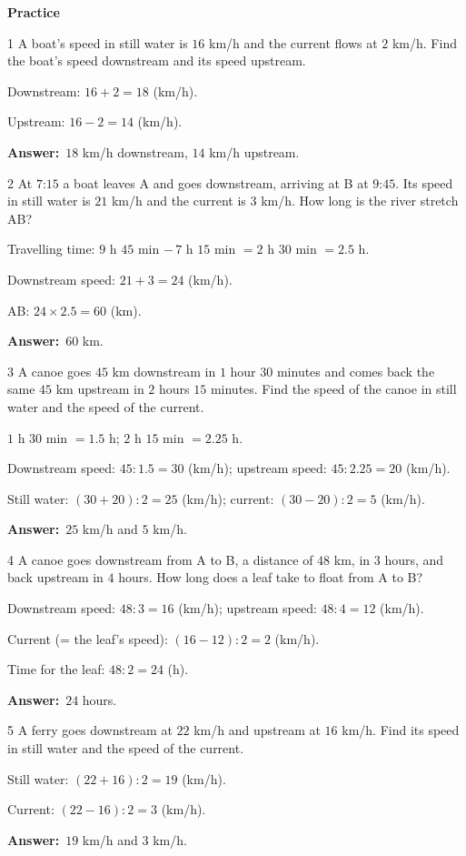 \documentclass[11pt]{article}
\newif\ifsol \solfalse
\providecommand{\AnsWord}{Đáp số}
\newcommand{\dapso}[1]{\par\textbf{\AnsWord:}\ #1}
\newcommand{\probsol}[1]{%
  \begin{lrbox}{\solmeasure}\begin{minipage}{\dimexpr\linewidth-24pt\relax}#1\end{minipage}\end{lrbox}%
  \ifsol
    \begin{solbox}#1\end{solbox}%
  \else
    \setlength{\solht}{\dimexpr\ht\solmeasure+\dp\solmeasure+0.85cm\relax}%
    \ifdim\solht<1.35cm\setlength{\solht}{1.35cm}\fi
    \begin{tcolorbox}[colback=white,colframe=Line,boxrule=0.8pt,arc=5pt,
      left=8pt,right=8pt,top=4pt,bottom=4pt,height=\solht]{\footnotesize\color{Slate}\itshape\WorkWord}\end{tcolorbox}%
  \fi}
\newcommand{\dividerbar}[1]{\par\vspace{0.6em}\noindent
  \begin{tcolorbox}[enhanced,frame hidden,interior hidden,borderline west={5pt}{0pt}{ProbBlue},
    colback=white,left=12pt,right=12pt,top=5pt,bottom=5pt,arc=4pt]
  {\large\bfseries\color{ProbBlue} #1}\end{tcolorbox}\vspace{0.4em}}
\newcommand{\gap}{\vspace{0.3cm}}
\def\WorkWord{Your work:}
\def\AnsWord{Answer}
\begin{document}
\dividerbar{Practice}
\begin{probbox}{1}{\relax}
A boat's speed in still water is $16$ km/h and the current flows at $2$ km/h. Find the boat's speed downstream and its speed upstream.
\end{probbox}
\probsol{
Downstream: $16+2=18$ (km/h).\par Upstream: $16-2=14$ (km/h).
\dapso{$18$ km/h downstream, $14$ km/h upstream.}}
\gap
\begin{probbox}{2}{\relax}
At $7$:$15$ a boat leaves A and goes downstream, arriving at B at $9$:$45$. Its speed in still water is $21$ km/h and the current is $3$ km/h. How long is the river stretch AB?
\end{probbox}
\probsol{
Travelling time: $9$ h $45$ min $-\,7$ h $15$ min $=2$ h $30$ min $=2.5$ h.\par
Downstream speed: $21+3=24$ (km/h).\par AB: $24\times2.5=60$ (km).
\dapso{$60$ km.}}
\gap
\begin{probbox}{3}{\relax}
A canoe goes $45$ km downstream in $1$ hour $30$ minutes and comes back the same $45$ km upstream in $2$ hours $15$ minutes. Find the speed of the canoe in still water and the speed of the current.
\end{probbox}
\probsol{
$1$ h $30$ min $=1.5$ h; $2$ h $15$ min $=2.25$ h.\par
Downstream speed: $45:1.5=30$ (km/h); upstream speed: $45:2.25=20$ (km/h).\par
Still water: $(30+20):2=25$ (km/h); current: $(30-20):2=5$ (km/h).
\dapso{$25$ km/h and $5$ km/h.}}
\gap
\begin{probbox}{4}{\relax}
A canoe goes downstream from A to B, a distance of $48$ km, in $3$ hours, and back upstream in $4$ hours. How long does a leaf take to float from A to B?
\end{probbox}
\probsol{
Downstream speed: $48:3=16$ (km/h); upstream speed: $48:4=12$ (km/h).\par
Current (= the leaf's speed): $(16-12):2=2$ (km/h).\par Time for the leaf: $48:2=24$ (h).
\dapso{$24$ hours.}}
\gap
\begin{probbox}{5}{\relax}
A ferry goes downstream at $22$ km/h and upstream at $16$ km/h. Find its speed in still water and the speed of the current.
\end{probbox}
\probsol{
Still water: $(22+16):2=19$ (km/h).\par Current: $(22-16):2=3$ (km/h).
\dapso{$19$ km/h and $3$ km/h.}}
\end{document}
